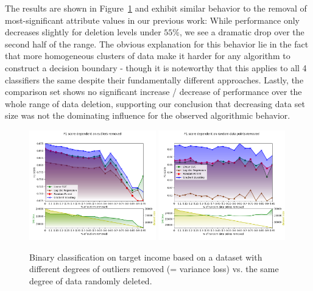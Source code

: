 \documentclass{llncs}
\begin{document}
The results are shown in Figure~\ref{fig:results_outliers_removed} and exhibit similar behavior to the removal of most-significant attribute values in our previous work: While performance only decreases slightly for deletion levels under $55\%$, we see a dramatic drop over the second half of the range. The obvious explanation for this behavior lie in the fact that more homogeneous clusters of data make it harder for any algorithm to construct a decision boundary - though it is noteworthy that this applies to all 4 classifiers the same despite their fundamentally different approaches. Lastly, the comparison set shows no significant increase / decrease of performance over the whole range of data deletion, supporting our conclusion that decreasing data set size was not the dominating influence for the observed algorithmic behavior.


\begin{figure}[!h]
	\centering
	\includegraphics[width=0.49\textwidth]{figures/outliers/outliers_removed_all_algos_std_blur_bright}
	\includegraphics[width=0.49\textwidth]{figures/outliers/randomly_removed_points_all_algos_std_blur_bright}
	\caption{Binary classification on target income based on a dataset with different degrees of outliers removed (= variance loss) vs. the same degree of data randomly deleted.}
	\label{fig:results_outliers_removed}
\end{figure}
\end{document}
